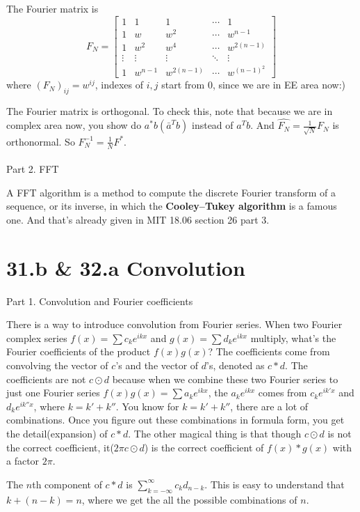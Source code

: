 \documentclass{article}
\begin{document}
\begin{spacing}{1.5}
The Fourier matrix is 
$$
F_N =
\begin{bmatrix}
1 & 1 & 1 & \cdots & 1\\
1 & w & w^2 & \cdots & w^{n-1}\\
1 & w^2 & w^4 & \cdots & w^{2(n-1)}\\
\vdots &\vdots&  \vdots & \ddots &  \vdots \\
1 & w^{n-1} & w^{2(n-1)} & \cdots & w^{(n-1)^2}
\end{bmatrix}
$$
where $(F_N)_{ij}=w^{ij}$, indexes of $i, j$ start from 0, since we are in EE area now:)

The Fourier matrix is orthogonal. To check this, note that because we are in complex area now, you show do $a^*b(\bar a^Tb)$ instead of $a^Tb$. And $\hat {F_N}=\frac{1}{\sqrt N}F_N$ is orthonormal. So $F_N^{-1}=\frac{1}{N}F^*$.
\\\\Part 2. FFT

A FFT algorithm is a method to compute the discrete Fourier transform of a sequence, or its inverse, in which the {\bfseries Cooley–Tukey algorithm} is a famous one. And that's already given in MIT 18.06 section 26 part 3.

\section*{31.b \& 32.a Convolution}
Part 1.  Convolution and Fourier coefficients

There is a way to introduce convolution from Fourier series. When two Fourier complex series $f(x) = \sum c_k e^{ikx}$ and $g(x) = \sum d_k e^{ikx}$ multiply, what's the Fourier coefficients of the product $f(x)g(x)$? The coefficients come from convolving the vector of $c$'s and the vector of $d$'s, denoted as $c * d$. The coefficients are not $c \odot d$ because when we combine these two Fourier series to just one Fourier series $f(x)g(x) = \sum a_k e^{ikx}$, the $a_k e^{ikx}$ comes from $c_k e^{ik'x}$ and $d_k e^{ik''x}$, where $k = k' + k''$. You know for $k = k' + k''$, there are a lot of combinations. Once you figure out these combinations in formula form, you get the detail(expansion) of $c * d$. The other magical thing is that though $c \odot d$ is not the correct coefficient, it($2\pi c \odot d$) is the correct coefficient of $f(x) * g(x)$ with a factor $2\pi$.

The $n$th component of $c*d$ is $\sum_{k=-\infty}^{\infty}c_kd_{n-k}$. This is easy to understand that $k + (n-k)=n$, where we get the all the possible combinations of $n$.


\end{spacing}
\end{document}
